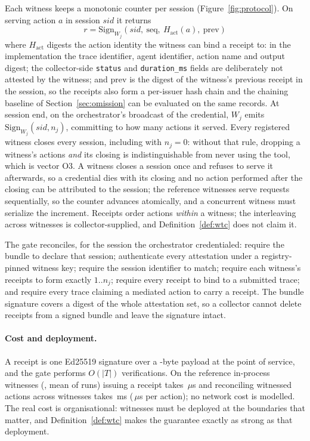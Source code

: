 \documentclass[letterpaper,10pt,twocolumn]{article}
\theoremstyle{definition}
\begin{document}
Each witness keeps a monotonic counter per session (Figure~\ref{fig:protocol}). On serving action $a$ in session $\mathit{sid}$ it returns
\begin{equation}
r = \mathrm{Sign}_{W_j}(\mathit{sid},\ \mathrm{seq},\ H_{\mathrm{act}}(a),\ \mathrm{prev})
\end{equation}
where $H_{\mathrm{act}}$ digests the action identity the witness can bind a receipt to: in the implementation the trace identifier, agent identifier, action name and output digest; the collector-side \texttt{status} and \texttt{duration\_ms} fields are deliberately not attested by the witness; and $\mathrm{prev}$ is the digest of the witness's previous receipt in the session, so the receipts also form a per-issuer hash chain and the chaining baseline of Section~\ref{sec:omission} can be evaluated on the same records. At session end, on the orchestrator's broadcast of the credential, $W_j$ emits $\mathrm{Sign}_{W_j}(\mathit{sid}, n_j)$, committing to how many actions it served. Every registered witness closes every session, including with $n_j=0$: without that rule, dropping a witness's actions \emph{and} its closing is indistinguishable from never using the tool, which is vector O3. A witness closes a session once and refuses to serve it afterwards, so a credential dies with its closing and no action performed after the closing can be attributed to the session; the reference witnesses serve requests sequentially, so the counter advances atomically, and a concurrent witness must serialize the increment. Receipts order actions \emph{within} a witness; the interleaving across witnesses is collector-supplied, and Definition~\ref{def:wtc} does not claim it.

The gate reconciles, for the session the orchestrator credentialed: require the bundle to declare that session; authenticate every attestation under a registry-pinned witness key; require the session identifier to match; require each witness's receipts to form exactly $1..n_j$; require every receipt to bind to a submitted trace; and require every trace claiming a mediated action to carry a receipt. The bundle signature covers a digest of the whole attestation set, so a collector cannot delete receipts from a signed bundle and leave the signature intact.

\paragraph{Cost and deployment.} A receipt is one Ed25519 signature over a \witnessReceiptBytes-byte payload at the point of service, and the gate performs $O(|T|)$ verifications. On the reference in-process witnesses (\witnessPlatform, mean of \witnessRepeats{} runs) issuing a receipt takes \witnessIssueUs\,$\mu$s and reconciling \witnessActions{} witnessed actions across \witnessCount{} witnesses takes \witnessReconcileMs\,ms (\witnessReconcilePerActionUs\,$\mu$s per action); no network cost is modelled. The real cost is organisational: witnesses must be deployed at the boundaries that matter, and Definition~\ref{def:wtc} makes the guarantee exactly as strong as that deployment.
\end{document}
